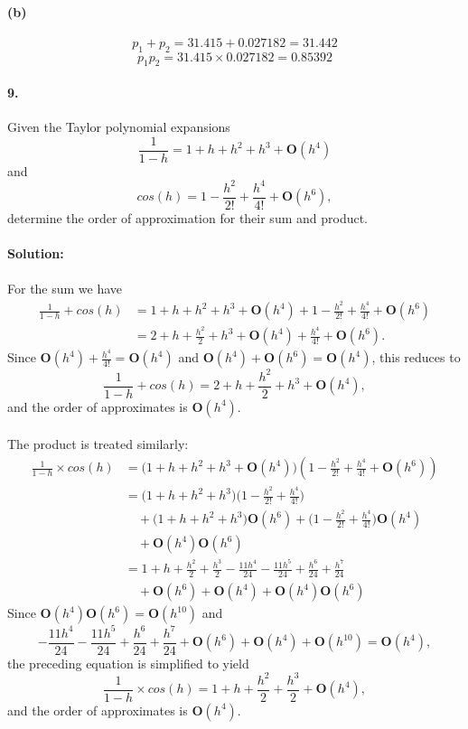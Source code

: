 \documentclass{article}  %
\begin{document}
        \paragraph{(b)}
        $$p_1 + p_2 = 31.415 + 0.027182 = 31.442$$
        $$p_1p_2 = 31.415 \times 0.027182 = 0.85392$$
        \paragraph{9.} Given the Taylor polynomial expansions
        $$\frac{1}{1-h} = 1 + h + h^2 + h^3 + \bm{O}(h^4)$$
        and
        $$cos(h) = 1 - \frac{h^2}{2!} + \frac{h^4}{4!} + \bm{O}(h^6),$$
        determine the order of approximation for their sum and product.
        \paragraph{Solution:}
        \paragraph{}For the sum we have
        \begin{align*}
        \frac{1}{1-h} + cos(h) &= 1 + h + h^2 + h^3 + \bm{O}(h^4) + 1 - \frac{h^2}{2!} + \frac{h^4}{4!} + \bm{O}(h^6) \\
        &= 2 + h + \frac{h^2}{2} + h^3 + \bm{O}(h^4) + \frac{h^4}{4!} + \bm{O}(h^6).
        \end{align*}
        Since \(\bm{O}(h^4) + \frac{h^4}{4!} = \bm{O}(h^4)\) and \(\bm{O}(h^4) + \bm{O}(h^6) = \bm{O}(h^4)\), this reduces to
        $$\frac{1}{1-h} + cos(h) = 2 + h + \frac{h^2}{2} + h^3 + \bm{O}(h^4),$$
        and the order of approximates is \(\bm{O}(h^4)\).
        \paragraph{}The product is treated similarly:
        \[ \begin{split}
            \frac{1}{1-h} \times cos(h) &= \bigg(1 + h + h^2 + h^3 + \bm{O}(h^4) \bigg)\left(1 - \frac{h^2}{2!} + \frac{h^4}{4!} + \bm{O}(h^6)\right) \\
            &= \bigg(1 + h + h^2 + h^3\bigg)\bigg(1 - \frac{h^2}{2!} + \frac{h^4}{4!}\bigg) \\ 
            &\quad+ \bigg(1 + h + h^2 + h^3\bigg)\bm{O}(h^6) + \bigg(1 - \frac{h^2}{2!} + \frac{h^4}{4!}\bigg)\bm{O}(h^4) \\
            &\quad+ \bm{O}(h^4)\bm{O}(h^6) \\
            &= 1 + h + \frac{h^2}{2} + \frac{h^3}{2} - \frac{11h^4}{24} - \frac{11h^5}{24} + \frac{h^6}{24} + \frac{h^7}{24} \\
            &\quad+ \bm{O}(h^6) + \bm{O}(h^4) + \bm{O}(h^4)\bm{O}(h^6) 
        \end{split} \]
        Since $\bm{O}(h^4)\bm{O}(h^6) = \bm{O}(h^{10})$ and
        $$- \frac{11h^4}{24} - \frac{11h^5}{24} + \frac{h^6}{24} + \frac{h^7}{24} + \bm{O}(h^6) + \bm{O}(h^4) + \bm{O}(h^{10}) = \bm{O}(h^4),$$
        the preceding equation is simplified to yield
        $$\frac{1}{1-h} \times cos(h) = 1 + h + \frac{h^2}{2} + \frac{h^3}{2} + \bm{O}(h^4),$$ 
        and the order of approximates is \(\bm{O}(h^4)\).
\end{document}
